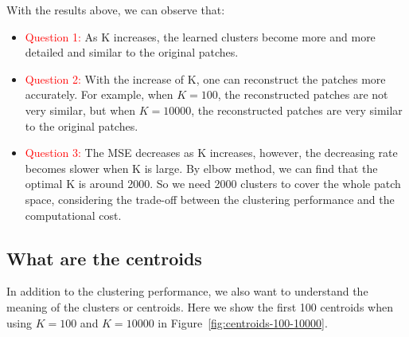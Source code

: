 \documentclass{article}
\begin{document}
With the results above, we can observe that:
\begin{itemize}
    \item \textcolor{red}{Question 1:} As K increases, the learned clusters become more and more detailed and similar to the original patches.
    \item \textcolor{red}{Question 2:} With the increase of K, one can reconstruct the patches more accurately. For example, when $K = 100$, the reconstructed patches are not very similar, but when $K = 10000$, the reconstructed patches are very similar to the original patches.
    \item \textcolor{red}{Question 3:} The MSE decreases as K increases, however, the decreasing rate becomes slower when K is large. By elbow method, we can find that the optimal K is around 2000. So we need 2000 clusters to cover the whole patch space, considering the trade-off between the clustering performance and the computational cost.
\end{itemize}


\subsection{What are the centroids}

In addition to the clustering performance, we also want to understand the meaning of the clusters or centroids. 
Here we show the first 100 centroids when using $K = 100$ and $K = 10000$ in Figure~\ref{fig:centroids-100-10000}.
\end{document}
